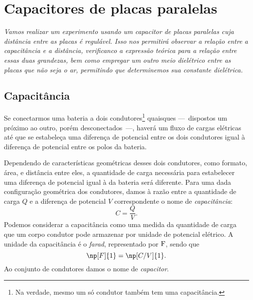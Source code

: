 \chapter{Capacitores de placas paralelas} %
\label{Chap:CapacPlacasPar}        %

\begin{fullwidth}\it
	Vamos realizar um experimento usando um capacitor de placas paralelas cuja distância entre as placas é regulável. Isso nos permitirá observar a relação entre a capacitância e a distância, verificanco a expressão teórica para a relação entre essas duas grandezas, bem como empregar um outro meio dielétrico entre as placas que não seja o ar, permitindo que determinemos sua constante dielétrica.
\end{fullwidth}

\section{Capacitância}

Se conectarmos uma bateria a dois condutores\footnote{Na verdade, mesmo um só condutor também tem uma capacitância.} quaisques ---~dispostos um próximo ao outro, porém desconectados~---, haverá um fluxo de cargas elétricas até que se estabeleça uma diferença de potencial entre os dois condutores igual à diferença de potencial entre os polos da bateria.

Dependendo de características geométricas desses dois condutores, como formato, área, e distância entre eles, a quantidade de carga necessária para estabelecer uma diferença de potencial igual à da bateria será diferente. Para uma dada configuração geométrica dos condutores, damos à razão entre a quantidade de carga $Q$ e a diferença de potencial $V$ correspondente o nome de \emph{capacitância}:
\begin{equation}\label{Eq:DefCapacitancia}
	C = \frac{Q}{V}.
\end{equation}
%
Podemos considerar a capacitância como uma medida da quantidade de carga que um corpo condutor pode armazenar por unidade de potencial elétrico. A unidade da capacitância é o \emph{farad}, representado por $\rm{F}$, sendo que
\begin{equation}
	\np[F]{1} = \np[C/V]{1}.
\end{equation}
%
Ao conjunto de condutores damos o nome de \emph{capacitor}.

